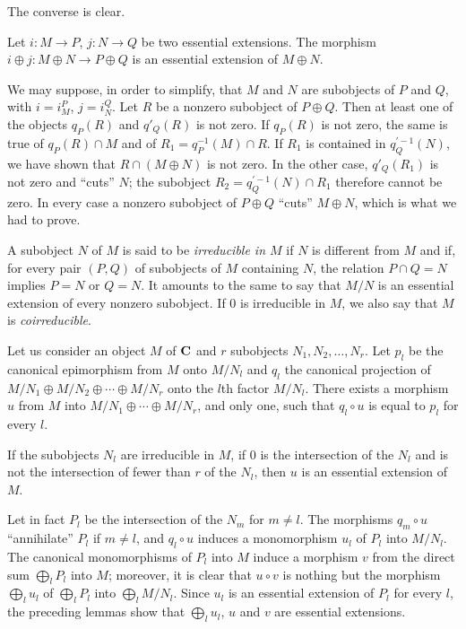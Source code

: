 The converse is clear.

\begin{lemma}
Let $i\colon M\to P$, $j\colon N\to Q$ be two essential extensions. The
morphism $i\oplus j\colon M\oplus N\to P\oplus Q$ is an essential
extension of $M\oplus N$.
\end{lemma}

We may suppose, in order to simplify, that $M$ and $N$ are subobjects
of $P$ and $Q$, with $i = i_M^P$, $j = i_N^Q$. Let $R$ be a nonzero
subobject of $P\oplus Q$. Then at least one of the objects $q_P(R)$
and $q'_Q(R)$ is not zero. If $q_P(R)$ is not zero, the same is true of
$q_P(R)\cap M$ and of $R_1 = q_P^{-1}(M)\cap R$. If $R_1$ is contained
in $q_Q^{\prime-1}(N)$, we have shown that $R\cap (M\oplus N)$ is not zero.
In the other case, $q'_Q(R_1)$ is not zero and ``cuts'' $N$; the
subobject $R_2 = q_Q^{\prime-1}(N)\cap R_1$ therefore cannot be zero. In every
case a nonzero subobject of $P\oplus Q$ ``cuts'' $M\oplus N$, which is
what we had to prove.

A subobject $N$ of $M$ is said to be \emph{irreducible in $M$} if $N$
is different from $M$ and if, for every pair $(P,Q)$ of subobjects of
$M$ containing $N$, the relation $P\cap Q = N$ implies $P = N$ or
$Q = N$. It amounts to the same to say that $M/N$ is an essential
extension of every nonzero subobject. If $0$ is irreducible in $M$, we
also say that $M$ is \emph{coirreducible}.

Let us consider an object $M$ of $\mathbf{C}$ and $r$ subobjects
$N_1, N_2, \ldots, N_r$. Let $p_l$ be the canonical epimorphism from
$M$ onto $M/N_l$ and $q_l$ the canonical projection of
$M/N_1\oplus M/N_2\oplus\cdots\oplus M/N_r$ onto the $l$th factor
$M/N_l$. There exists a morphism $u$ from $M$ into
$M/N_1\oplus\cdots\oplus M/N_r$, and only one, such that $q_l\circ u$
is equal to $p_l$ for every $l$.

\begin{lemma}
If the subobjects $N_l$ are irreducible in $M$, if $0$ is the
intersection of the $N_l$ and is not the intersection of fewer than $r$
of the $N_l$, then $u$ is an essential extension of $M$.
\end{lemma}

Let in fact $P_l$ be the intersection of the $N_m$ for $m \neq l$. The
morphisms $q_m\circ u$ ``annihilate'' $P_l$ if $m \neq l$, and
$q_l\circ u$ induces a monomorphism $u_l$ of $P_l$ into $M/N_l$. The
canonical monomorphisms of $P_l$ into $M$ induce a morphism $v$ from
the direct sum $\bigoplus_l P_l$ into $M$; moreover, it is clear that
$u\circ v$ is nothing but the morphism $\bigoplus_l u_l$ of
$\bigoplus_l P_l$ into $\bigoplus_l M/N_l$. Since $u_l$ is an essential
extension of $P_l$ for every $l$, the preceding lemmas show that
$\bigoplus_l u_l$, $u$ and $v$ are essential extensions.

